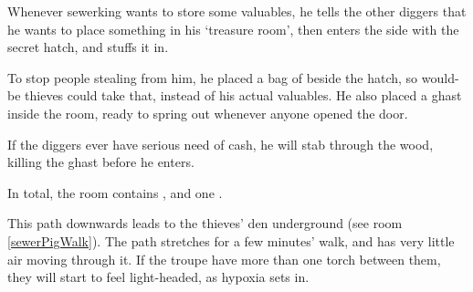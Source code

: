 Whenever \gls{sewerking} wants to store some valuables, he tells the other \glspl{digger} that he wants to place something in his `treasure room', then enters the side with the secret hatch, and stuffs it in.

To stop people stealing from him, he placed a bag of  beside the hatch, so would-be thieves could take that, instead of his actual valuables.
He also placed a ghast inside the room, ready to spring out whenever anyone opened the door.

If the \glspl{digger} ever have serious need of cash, he will stab through the wood, killing the ghast before he enters.


In total, the room contains \lootBig, and one \lootMagic.

\showTalisman

This path downwards leads to the thieves' den underground (see room \vref{sewerPigWalk}).
The path stretches for a few minutes' walk, and has very little air moving through it.
If the troupe have more than one torch between them, they will start to feel light-headed, as hypoxia sets in.%

